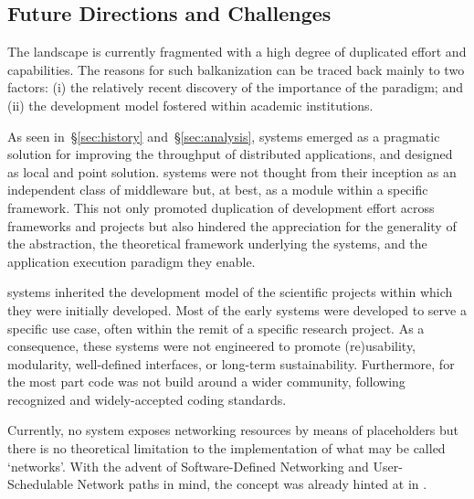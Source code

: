 \documentclass{sig-alternate}
\begin{document}
%
\subsection{Future Directions and Challenges}
\label{sec:future}

The \pilot landscape is currently fragmented with a high degree of duplicated
effort and capabilities. The reasons for such balkanization can be traced
back mainly to two factors: (i) the relatively recent discovery of the
importance of the \pilot paradigm; and (ii) the development model fostered
within academic institutions.

As seen in~\S\ref{sec:history} and~\S\ref{sec:analysis}, \pilot systems emerged
as a pragmatic solution for improving the throughput of distributed
applications, and designed as local and point solution.  \pilot systems were not
thought from their inception as an independent class of middleware but, at best,
as a module within a specific framework.  This not only promoted duplication of
development effort across frameworks and projects but also hindered the
appreciation for the generality of the \pilot abstraction, the theoretical
framework underlying the \pilot systems, and the application execution paradigm
they enable. 

\pilot systems inherited the development model of the scientific projects
within which they were initially developed. Most of the early \pilot systems
were developed to serve a specific use case, often within the remit of a
specific research project. As a consequence, these systems were not engineered
to promote (re)usability, modularity, well-defined interfaces, or long-term
sustainability. Furthermore, for the most part code was not build around a
wider community, following recognized and widely-accepted coding standards.

 Currently, no \pilot system exposes networking
resources by means of placeholders but there is no theoretical limitation to the
implementation of what may be called `\pilot networks'. With the advent of
Software-Defined Networking and User-Schedulable Network paths in mind, the
concept was already hinted at in \cite{santcroos2012}.
\end{document}
